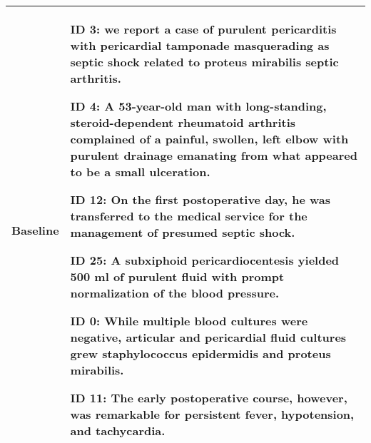 \documentclass[11pt]{article}
\begin{document}
\begin{table}[!hbt]
{\begin{tabular}{|p{0.1\linewidth}|p{0.9\linewidth}|}
 \hline
\textbf{Baseline}& 
\begin{tcolorbox}[
 colback=red!50, coltext=black, sharp corners, colframe=black, boxrule=0pt, boxsep=2pt,left=2pt,right=2pt,top=0pt,bottom=0pt,after skip=0pt,before skip=0pt
 ] ID 3: we report a case of purulent pericarditis with pericardial tamponade masquerading as septic shock related to proteus mirabilis septic arthritis.
 \end{tcolorbox}
 \begin{tcolorbox}[
 colback=red!50, coltext=black, sharp corners, colframe=black, boxrule=0pt, boxsep=2pt,left=2pt,right=2pt,top=0pt,bottom=0pt,after skip=0pt,before skip=0pt
 ]
 ID 4: A 53-year-old man with long-standing, steroid-dependent rheumatoid arthritis complained of a painful, swollen, left elbow with purulent drainage emanating from what appeared to be a small ulceration. 
 \end{tcolorbox}
 \begin{tcolorbox}[
 colback=red!5, coltext=black, sharp corners, colframe=black, boxrule=0pt, boxsep=2pt,left=2pt,right=2pt,top=0pt,bottom=0pt,after skip=0pt,before skip=0pt
 ]
 ID 12: On the first postoperative day, he was transferred to the medical service for the management of presumed septic shock. 
 \end{tcolorbox}
 \begin{tcolorbox}[
 colback=red!10, coltext=black, sharp corners, colframe=black, boxrule=0pt, boxsep=2pt,left=2pt,right=2pt,top=0pt,bottom=0pt,after skip=0pt,before skip=0pt
 ]
 ID 25: A subxiphoid pericardiocentesis yielded 500 ml of purulent fluid with prompt normalization of the blood pressure. 
 \end{tcolorbox}
 \begin{tcolorbox}[
 colback=red!30, coltext=black, sharp corners, colframe=black, boxrule=0pt, boxsep=2pt,left=2pt,right=2pt,top=0pt,bottom=0pt,after skip=0pt,before skip=0pt
 ]
 ID 0: While multiple blood cultures were negative, articular and pericardial fluid cultures grew staphylococcus epidermidis and proteus mirabilis.
 \end{tcolorbox}
 \begin{tcolorbox}[
 colback=red!5, coltext=black, sharp corners, colframe=black, boxrule=0pt, boxsep=2pt,left=2pt,right=2pt,top=0pt,bottom=0pt,after skip=0pt,before skip=0pt
 ]
 ID 11: The early postoperative course, however, was remarkable for persistent fever, hypotension, and tachycardia.
 \end{tcolorbox}\\
\hline

\end{tabular}}
\end{table}
\end{document}
